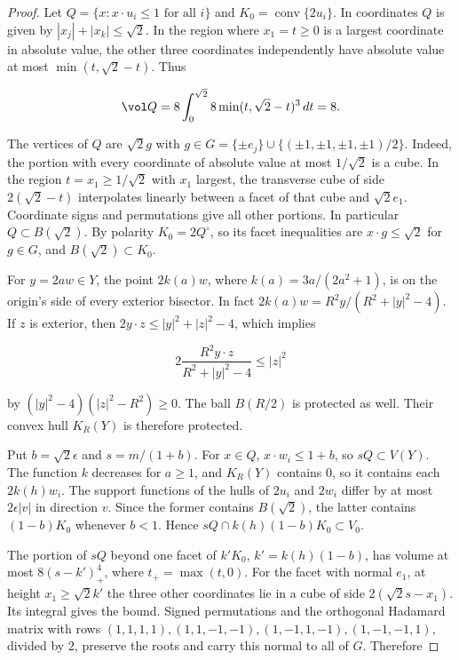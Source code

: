 \begin{proof}
Let $Q=\{x:x\cdot u_i\le1\text{ for all }i\}$ and $K_0=\operatorname{conv}\{2u_i\}$. In
coordinates $Q$ is given by $|x_j|+|x_k|\le\sqrt2$. In the region where $x_1=t\ge0$ is a
largest coordinate in absolute value, the other three coordinates independently have
absolute value at most $\min(t,\sqrt2-t)$. Thus

\[
\vol Q=8\int_0^{\sqrt2}8\min(t,\sqrt2-t)^3\,dt=8.
\]

The vertices of $Q$ are $\sqrt2 g$ with $g\in G=\{\pm
e_j\}\cup\{(\pm1,\pm1,\pm1,\pm1)/2\}$. Indeed, the portion with every coordinate of
absolute value at most $1/\sqrt2$ is a cube. In the region $t=x_1\ge1/\sqrt2$ with $x_1$
largest, the transverse cube of side $2(\sqrt2-t)$ interpolates linearly between a facet
of that cube and $\sqrt2e_1$. Coordinate signs and permutations give all other portions.
In particular $Q\subset B(\sqrt2)$. By polarity $K_0=2Q^\circ$, so its facet inequalities
are $x\cdot g\le\sqrt2$ for $g\in G$, and $B(\sqrt2)\subset K_0$.

For $y=2aw\in Y$, the point $2k(a)w$, where $k(a)=3a/(2a^2+1)$, is on the origin's side of
every exterior bisector. In fact $2k(a)w=R^2y/(R^2+|y|^2-4)$. If $z$ is exterior, then
$2y\cdot z\le |y|^2+|z|^2-4$, which implies

\[
2\frac{R^2y\cdot z}{R^2+|y|^2-4}\le |z|^2
\]

by $(|y|^2-4)(|z|^2-R^2)\ge0$. The ball $B(R/2)$ is protected as well. Their convex hull
$K_R(Y)$ is therefore protected.

Put $b=\sqrt2\epsilon$ and $s=m/(1+b)$. For $x\in Q$, $x\cdot w_i\le1+b$, so $sQ\subset
V(Y)$. The function $k$ decreases for $a\ge1$, and $K_R(Y)$ contains $0$, so it contains
each $2k(h)w_i$. The support functions of the hulls of $2u_i$ and $2w_i$ differ by at most
$2\epsilon|v|$ in direction $v$. Since the former contains $B(\sqrt2)$, the latter
contains $(1-b)K_0$ whenever $b<1$. Hence $sQ\cap k(h)(1-b)K_0\subset V_0$.

The portion of $sQ$ beyond one facet of $k'K_0$, $k'=k(h)(1-b)$, has volume at most
$8(s-k')_+^4$, where $t_+=\max(t,0)$. For the facet with normal $e_1$, at height
$x_1\ge\sqrt2k'$ the three other coordinates lie in a cube of side $2(\sqrt2s-x_1)$. Its
integral gives the bound. Signed permutations and the orthogonal Hadamard matrix with rows
$(1,1,1,1),(1,1,-1,-1),(1,-1,1,-1),(1,-1,-1,1)$, divided by $2$, preserve the roots and
carry this normal to all of $G$. Therefore


\end{proof}
